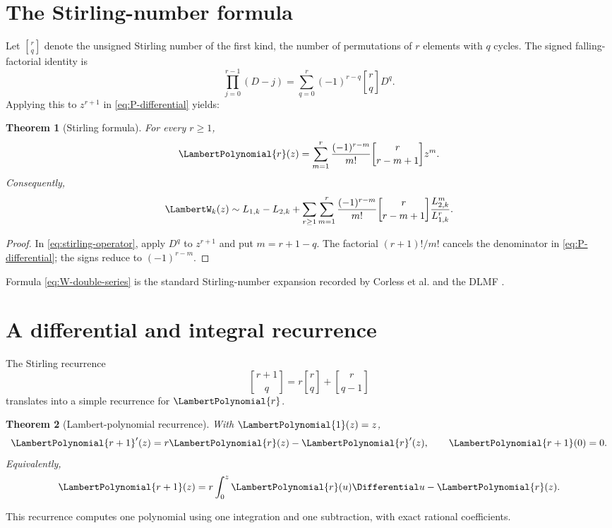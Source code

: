 \documentclass[11pt,oneside]{book}
\newtheorem{theorem}{Theorem}[chapter]
\theoremstyle{definition}
\theoremstyle{remark}
\newcommand{\stirlingone}[2]{\genfrac{[}{]}{0pt}{}{#1}{#2}}
\begin{document}
\section{The Stirling-number formula}
Let $\stirlingone{r}{q}$ denote the unsigned Stirling number of the first kind,
the number of permutations of $r$ elements with $q$ cycles.  The signed
falling-factorial identity is
\begin{equation}\label{eq:stirling-operator}
 \prod_{j=0}^{r-1}(D-j)
 =\sum_{q=0}^{r}(-1)^{r-q}\stirlingone{r}{q}D^q.
\end{equation}
Applying this to $z^{r+1}$ in \eqref{eq:P-differential} yields:

\begin{theorem}[Stirling formula]\label{thm:P-stirling}
For every $r\ge1$,
\begin{equation}\label{eq:P-stirling}
 \LambertPolynomial{r}(z)=\sum_{m=1}^{r}
 \frac{(-1)^{r-m}}{m!}
 \stirlingone{r}{r-m+1}z^m.
\end{equation}
Consequently,
\begin{equation}\label{eq:W-double-series}
 \LambertW_k(z)\sim L_{1,k}-L_{2,k}
 +\sum_{r\ge1}\sum_{m=1}^{r}
 \frac{(-1)^{r-m}}{m!}
 \stirlingone{r}{r-m+1}
 \frac{L_{2,k}^m}{L_{1,k}^r}.
\end{equation}
\end{theorem}
\begin{proof}
In \eqref{eq:stirling-operator}, apply $D^q$ to $z^{r+1}$ and put
$m=r+1-q$.  The factorial $(r+1)!/m!$ cancels the denominator in
\eqref{eq:P-differential}; the signs reduce to $(-1)^{r-m}$.
\end{proof}

Formula \eqref{eq:W-double-series} is the standard Stirling-number expansion
recorded by Corless et al. and the DLMF \cite{Corless1996,DLMF413}.

\section{A differential and integral recurrence}
The Stirling recurrence
\[
 \stirlingone{r+1}{q}=r\stirlingone{r}{q}
 +\stirlingone{r}{q-1}
\]
translates into a simple recurrence for $\LambertPolynomial{r}$.

\begin{theorem}[Lambert-polynomial recurrence]\label{thm:P-recurrence}
With $\LambertPolynomial{1}(z)=z$,
\begin{equation}\label{eq:P-differential-recurrence}
 \LambertPolynomial{r+1}'(z)=r\LambertPolynomial{r}(z)-\LambertPolynomial{r}'(z),
 \qquad \LambertPolynomial{r+1}(0)=0.
\end{equation}
Equivalently,
\begin{equation}\label{eq:P-integral-recurrence}
 \LambertPolynomial{r+1}(z)=r\int_0^z\LambertPolynomial{r}(u)\Differential u-\LambertPolynomial{r}(z).
\end{equation}
\end{theorem}
This recurrence computes one polynomial using one integration and one
subtraction, with exact rational coefficients.
\end{document}
